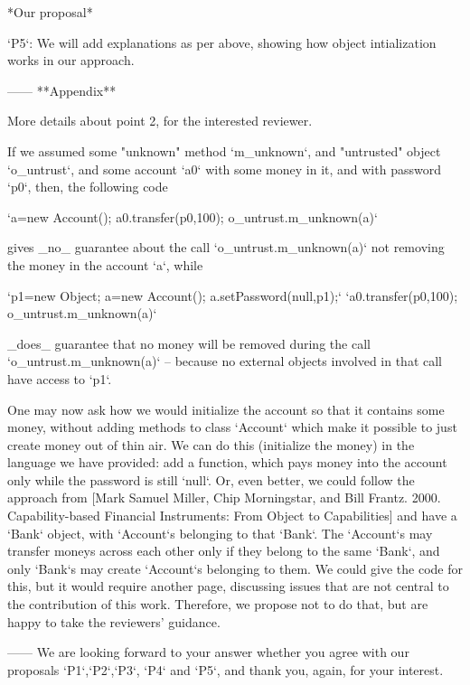 \documentclass[11pt]{amsart}
\begin{document}
*Our proposal* 

`P5`: We will add explanations as per above, showing how object intialization works 
in our approach. 

------
**Appendix**

More details about point 2, for the interested reviewer.

If we assumed some "unknown" method `m\_unknown`, and "untrusted" 
object `o\_untrust`, and some account `a0` with some money in it, and with password
`p0`, then, the following code

         `a=new Account(); a0.transfer(p0,100); o\_untrust.m\_unknown(a)`

gives \_no\_ guarantee about the call `o\_untrust.m\_unknown(a)` not removing the money in the account `a`, while

        `p1=new Object; a=new Account();  a.setPassword(null,p1);`
        `a0.transfer(p0,100);  o\_untrust.m\_unknown(a)`

\_does\_ guarantee that no money will be removed during the call `o\_untrust.m\_unknown(a)`
-- because no external objects involved in that call have access to `p1`.  

One may now ask how we would initialize the account so that it contains some money, 
without adding methods to class `Account` which make it possible to just create money
out of thin air. We can do this (initialize the money) in the language we have
provided: add a function, which pays money into the account only while the password 
is still `null`. Or, even better, we could follow the approach  from [Mark Samuel Miller, 
Chip Morningstar, and Bill Frantz. 2000. Capability-based Financial Instruments: 
From Object to Capabilities] and have a `Bank` object, with `Account`s belonging 
to that `Bank`. The `Account`s may transfer moneys across 
each other only if they belong to the same `Bank`, and only `Bank`s may create `Account`s 
belonging to them. We could give the code for this, but it would require another page, 
discussing issues that are not central to the contribution of this work. Therefore,
we propose not to do that, but are happy to take the reviewers' guidance.

------
We are looking forward to your answer whether you agree with our proposals `P1`,`P2`,`P3`, `P4` and `P5`, and thank you, again, for your interest.
 




 
\end{document}
